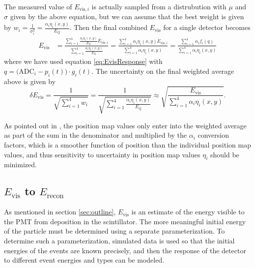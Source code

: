 The measured value of $E_{\mathrm{vis},i}$ is actually sampled from a distrubution with $\mu$ and $\sigma$ given by the
above equation, but we can assume that the best weight is given by $w_i = \frac{1}{\sigma_i^2} = \frac{\alpha_i \eta_i(x,y)}{E_Q}$.
Then the final combined $E_{\mathrm{vis}}$ for a single detector becomes
%
\begin{align}
  E_{\mathrm{vis}} &= \frac{\sum_{i=1}^{4} \frac{\alpha_i \eta_i(x,y)}{E_Q} E_{\mathrm{vis},i}}{\sum_{i=1}^{4} \frac{\alpha_i \eta_i(x,y)}{E_Q}}
  = \frac{\sum_{i=1}^{4} \alpha_i \eta_i(x,y) E_{\mathrm{vis},i}}{\sum_{i=1}^{4} \alpha_i \eta_i(x,y)} 
  = \frac{\sum_{i=1}^{4} \alpha_i f_i(q)}{\sum_{i=1}^{4} \alpha_i \eta_i(x,y)}
\end{align}
%
where we have used equation \ref{eq:EvisResponse} with $q=\big( \mathrm{ADC}_i - p_i(t) \big) \cdot g_i(t)$.
The uncertainty on the final weighted average above is given by
\begin{equation}
  \delta E_{\mathrm{vis}} = \frac{1}{\sqrt{\sum_{i=1}^{4} w_i}} = \frac{1}{\sqrt{\sum_{i=1}^{4} \frac{\alpha_i \eta_i(x,y)}{E_Q}}}
    \approx  \sqrt{\frac{E_{\mathrm{vis}}}{\sum_{i=1}^{4}\alpha_i \eta_i(x,y)}}.
\end{equation}

As pointed out in \cite{mpmThesis}, the position map values only enter into the weighted average
as part of the sum in the denominator and multiplied by the $\alpha_i$ conversion factors, which is a smoother
function of position than the individual position map values, and thus sensitivity to uncertainty in position map
values $\eta_i$ should be minimized.

\subsection{$E_{\mathrm{vis}}$ to $E_{\mathrm{recon}}$}

As mentioned in section \ref{sec:outline}, $E_{\mathrm{vis}}$ is an estimate of the
energy visible to the PMT from deposition in the scintillator. The more meaningful
initial energy of the particle must be determined using a separate parameterization.
To determine such a parameterization, simulated data is used so that the initial
energies of the events are known precisely, and then the response of the detector
to different event energies and types can be modeled.


